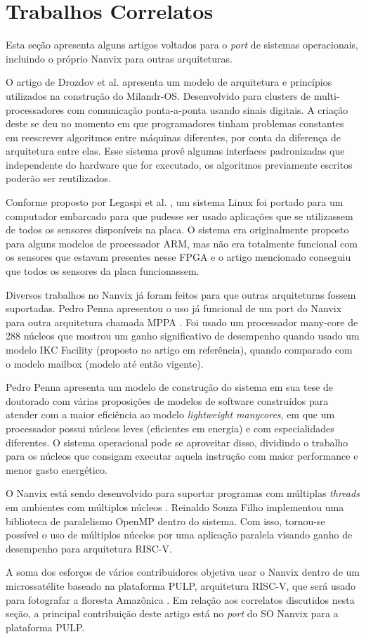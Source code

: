 \section{Trabalhos Correlatos}

Esta seção apresenta alguns artigos voltados para o \textit{port} de sistemas operacionais, incluindo o próprio Nanvix para outras arquiteturas.

O artigo de Drozdov et al. \cite{Drozdov2015RealTimeOS} apresenta um modelo de arquitetura e princípios utilizados na construção
do Milandr-OS. Desenvolvido para clusters de multi-processadores com comunicação ponta-a-ponta usando sinais digitais. A criação deste se deu no momento em que programadores tinham problemas constantes em reescrever algoritmos entre máquinas diferentes, por conta da diferença de arquitetura entre elas. Esse sistema provê algumas interfaces padronizadas que independente do hardware que for executado, os algoritmos previamente escritos poderão ser reutilizados.

Conforme proposto por Legaspi et al. \cite{7372829}, um sistema Linux foi portado para um computador embarcado para
que pudesse ser usado aplicações que se utilizassem de todos os sensores disponíveis na placa. O sistema era originalmente proposto para alguns modelos de processador ARM, mas não era totalmente funcional com os sensores que estavam presentes nesse FPGA e o artigo mencionado conseguiu que todos os sensores da placa funcionassem.

Diversos trabalhos no Nanvix já foram feitos para que outras arquiteturas fossem suportadas. Pedro Penna apresentou o uso já funcional de um port do Nanvix para outra arquitetura chamada MPPA \cite{PENNA20211}. Foi usado um processador many-core de 288 núcleos que mostrou um ganho significativo de desempenho quando usado um modelo IKC Facility (proposto no artigo em referência), quando comparado com o modelo mailbox (modelo até então vigente).

Pedro Penna apresenta um modelo de construção do sistema em sua tese de doutorado \cite{penna:tel-03545212} com várias proposições de modelos de software construídos para atender com a maior eficiência ao modelo \emph{lightweight manycores}, em que um processador possui núcleos leves (eficientes em energia) e com especialidades diferentes. O sistema operacional pode se aproveitar disso, dividindo o trabalho para os núcleos que consigam executar aquela instrução com maior performance e menor gasto energético.

O Nanvix está sendo desenvolvido para suportar programas com múltiplas \emph{threads} em ambientes com múltiplos núcleos \cite{MSC-Reinaldo}. Reinaldo Souza Filho implementou uma biblioteca de paralelismo OpenMP dentro do sistema. Com isso, tornou-se possível o uso de múltiplos núcelos por uma aplicação paralela visando ganho de desempenho para arquitetura RISC-V.

A soma dos esforços de vários contribuidores objetiva usar o Nanvix dentro de um microssatélite baseado na plataforma PULP, arquitetura RISC-V, que será usado para fotografar a floresta Amazônica \cite{RepoCervero}. Em relação aos correlatos discutidos nesta seção, a principal contribuição deste artigo está no \textit{port} do SO Nanvix para a plataforma PULP.
